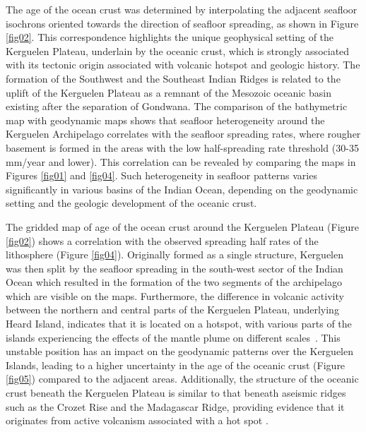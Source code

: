 \documentclass[geomatics,article,accept,pdftex,moreauthors]{Definitions/mdpi}
\begin{document}
The age of the ocean crust was determined by interpolating the adjacent seafloor isochrons oriented towards the direction of seafloor spreading, as shown in Figure \ref{fig02}. This correspondence highlights the unique geophysical setting of the Kerguelen Plateau, underlain by the oceanic crust, which is strongly associated with its tectonic origin associated with volcanic hotspot and geologic history. The formation of the Southwest and the Southeast Indian Ridges is related to the uplift of the Kerguelen Plateau as a remnant of the Mesozoic oceanic basin existing after the separation of Gondwana. The comparison of the bathymetric map with geodynamic maps shows that seafloor heterogeneity around the Kerguelen Archipelago correlates with the seafloor spreading rates, where rougher basement is formed in the areas with the low half-spreading rate threshold (30-35 mm/year and lower). This correlation can be revealed by comparing the maps in Figures \ref{fig01} and \ref{fig04}. Such heterogeneity in seafloor patterns varies significantly in various basins of the Indian Ocean, depending on the geodynamic setting and the geologic development of the oceanic crust. 

The gridded map of age of the ocean crust around the Kerguelen Plateau (Figure \ref{fig02}) shows a correlation with the observed spreading half rates of the lithosphere (Figure \ref{fig04}). Originally formed as a single structure, Kerguelen was then split by the seafloor spreading in the south-west sector of the Indian Ocean which resulted in the formation of the two segments of the archipelago~\cite{BRADLEY1988243} which are %
 visible on the maps. Furthermore, the difference in volcanic activity between the northern and central parts of the Kerguelen Plateau, underlying Heard Island, indicates that it is located on a hotspot, with various parts of the islands experiencing the effects of the mantle plume on different scales~\cite{Duncan2016,Plenier,HOUTZ197795}. This unstable position has an impact on the geodynamic patterns over the Kerguelen Islands, leading to a higher uncertainty in the age of the oceanic crust (Figure \ref{fig05}) compared to the adjacent areas. Additionally, the structure of the oceanic crust beneath the Kerguelen Plateau is similar to that beneath aseismic ridges such as the Crozet Rise and the Madagascar Ridge, providing evidence that it originates from active volcanism associated with a hot spot \cite{Recq}. %
\end{document}

